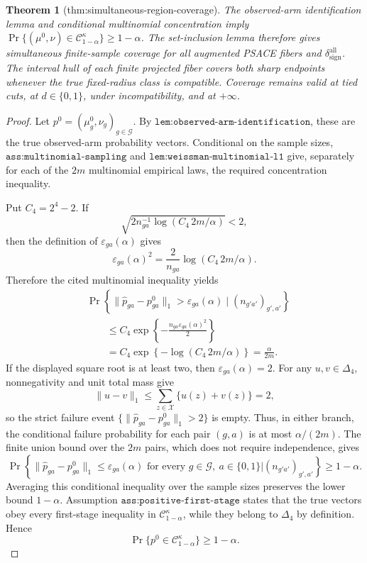 \documentclass{article}
\newtheorem{theorem}{Theorem}
\begin{document}
\begin{theorem}[thm:simultaneous-region-coverage]\label{thm:simultaneous-region-coverage}
The observed-arm identification lemma and conditional multinomial concentration imply \(\Pr\{(\mu^0,\nu)\in\mathcal C_{1-\alpha}^{\kappa}\}\ge1-\alpha\). The set-inclusion lemma therefore gives simultaneous finite-sample coverage for all augmented PSACE fibers and \(\delta_{\mathrm{sign}}^{\mathrm{all}}\). The interval hull of each finite projected fiber covers both sharp endpoints whenever the true fixed-radius class is compatible. Coverage remains valid at tied cuts, at \(d\in\{0,1\}\), under incompatibility, and at \(+\infty\).
\end{theorem}
\begin{proof}
Let \(p^0=(\mu_g^0,\nu_g)_{g\in\mathcal G}\). By \(\texttt{lem:observed-arm-identification}\), these are the true observed-arm probability vectors. Conditional on the sample sizes, \(\texttt{ass:multinomial-sampling}\) and \(\texttt{lem:weissman-multinomial-l1}\) give, separately for each of the \(2m\) multinomial empirical laws, the required concentration inequality.

Put \(C_4=2^4-2\). If
\[
 \sqrt{2n_{ga}^{-1}\log\!\left(C_4\,2m/\alpha\right)}<2,
\]
then the definition of \(\varepsilon_{ga}(\alpha)\) gives
\[
 \varepsilon_{ga}(\alpha)^2
 =\frac{2}{n_{ga}}\log\!\left(C_4\,2m/\alpha\right).
\]
Therefore the cited multinomial inequality yields
\[
\begin{aligned}
 &\Pr\!\left\{\|\widehat p_{ga}-p^0_{ga}\|_1>
 \varepsilon_{ga}(\alpha)\mid(n_{g'a'})_{g',a'}\right\}\\
 &\qquad\le C_4\exp\!\left\{-\frac{n_{ga}\varepsilon_{ga}(\alpha)^2}{2}\right\}\\
 &\qquad=C_4\exp\!\left\{-\log\!\left(C_4\,2m/\alpha\right)\right\}
 =\frac{\alpha}{2m}.
\end{aligned}
\]
If the displayed square root is at least two, then \(\varepsilon_{ga}(\alpha)=2\). For any \(u,v\in\Delta_4\), nonnegativity and unit total mass give
\[
 \|u-v\|_1\le\sum_{z\in\mathcal X}\{u(z)+v(z)\}=2,
\]
so the strict failure event \(\{\|\widehat p_{ga}-p^0_{ga}\|_1>2\}\) is empty. Thus, in either branch, the conditional failure probability for each pair \((g,a)\) is at most \(\alpha/(2m)\). The finite union bound over the \(2m\) pairs, which does not require independence, gives
\[
 \Pr\!\left\{
 \|\widehat p_{ga}-p^0_{ga}\|_1\le\varepsilon_{ga}(\alpha)
 \text{ for every }g\in\mathcal G,
 \ a\in\{0,1\}
 \mathrel{\Big|}(n_{g'a'})_{g',a'}
 \right\}\ge1-\alpha.
\]
Averaging this conditional inequality over the sample sizes preserves the lower bound \(1-\alpha\). Assumption \(\texttt{ass:positive-first-stage}\) states that the true vectors obey every first-stage inequality in \(\mathcal C_{1-\alpha}^{\kappa}\), while they belong to \(\Delta_4\) by definition. Hence
\[
 \Pr\{p^0\in\mathcal C_{1-\alpha}^{\kappa}\}\ge1-\alpha.
\]


\end{proof}
\end{document}
